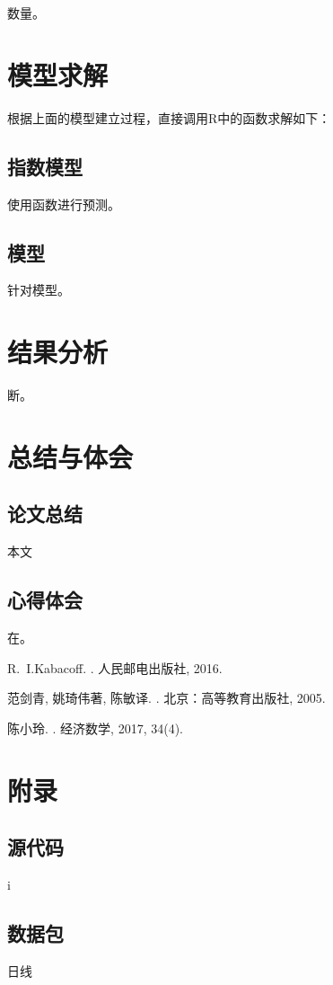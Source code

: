 \documentclass[10pt]{ctexart}
\begin{document}
		数量。
		
	
\section{模型求解}
	
	根据上面的模型建立过程，直接调用R中的函数求解如下：
	
	\subsection{指数模型}
	
	使用函数进行预测。
	
	\subsection{模型}
	
		针对模型。
		
		
		

		
\section{结果分析}
	
	断。
	
	
\section{总结与体会}
	
	\subsection{论文总结}
	
	本文
	
	\subsection{心得体会}
	
	在。
	
	
\begin{thebibliography}{1}		
		
R.~I.Kabacoff.
.
\newblock 人民邮电出版社, 2016.


范剑青, 姚琦伟著, 陈敏译.
.
\newblock  北京：高等教育出版社, 2005.
		
		
陈小玲.
.
\newblock 经济数学, 2017, 34(4).

\end{thebibliography}
	
	
	\section{附录}
	
	\subsection{源代码}
	
		i
	
	
	\subsection{数据包}
	
	日线
	

	
	
\end{document}
